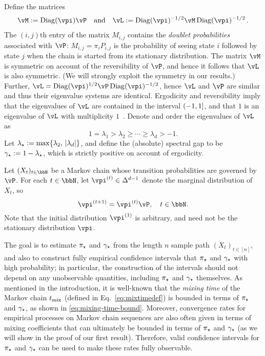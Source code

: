 Define the matrices
\begin{align*}
\vM := \Diag(\vpi) \vP \quad \text{and} \quad
\vL := \Diag(\vpi)^{-1/2} \vM \Diag(\vpi)^{-1/2}\,.
\end{align*}
The $(i,j)$th entry of the matrix $M_{i,j}$ contains the \emph{doublet
probabilities} associated with $\vP$: $M_{i,j} = \pi_i P_{i,j}$ is the
probability of seeing state $i$ followed by state $j$ when the chain
is started from its stationary distribution.
The matrix $\vM$ is symmetric on account of the reversibility of
$\vP$, and hence it follows that $\vL$ is also symmetric.
(We will strongly exploit the symmetry in our results.)
Further, $\vL = \Diag(\vpi)^{1/2} \vP \Diag(\vpi)^{-1/2}$, hence $\vL$
and $\vP$ are similar and thus their eigenvalue systems are identical.
Ergodicity and reversibility imply that the eigenvalues of $\vL$ are
contained in the interval $(-1,1]$, and that $1$ is an
eigenvalue of $\vL$ with multiplicity $1$~\citep[Lemmas 12.1 and
12.2]{LePeWi08}.
Denote and order the eigenvalues of $\vL$ as
\[
  1 = \lambda_1 > \lambda_2 \geq \dotsb \geq \lambda_d > -1 .
\]
Let $\lambda_{\star} := \max\{ \lambda_2,\, |\lambda_d| \}$, and define the
(absolute) spectral gap to be $\gamma_{\star} := 1-\lambda_{\star}$, which is strictly
positive on account of ergodicity.

Let $(X_t)_{t\in\bbN}$ be a Markov chain whose transition
probabilities are governed by $\vP$.
For each $t \in \bbN$, let $\vpi^{(t)} \in \Delta^{d-1}$ denote the
marginal distribution of $X_t$, so
\[
  \vpi^{(t+1)} = \vpi^{(t)} \vP ,
  \quad t \in \bbN .
\]
Note that the initial distribution $\vpi^{(1)}$ is arbitrary,
and need not be the stationary distribution $\vpi$.

The goal is to estimate $\pi_{\star}$ and $\gamma_{\star}$ from the length $n$ sample
path $(X_t)_{t \in [n]}$, and also to construct fully empirical
confidence intervals that $\pi_{\star}$ and $\gamma_{\star}$ with high probability;
in particular, the construction of the intervals should not depend on
any unobservable quantities, including $\pi_{\star}$ and $\gamma_{\star}$ themselves.
As mentioned in the introduction,
it is well-known that the \emph{mixing time} of the Markov chain
$t_{\operatorname{mix}}$ (defined in Eq.~\ref{eq:mixtimedef})
is bounded in terms of $\pi_{\star}$ and $\gamma_{\star}$, as shown in
\cref{eq:mixing-time-bound}.
Moreover, convergence rates for empirical processes on Markov chain
sequences are also often given in terms of mixing coefficients that
can ultimately be bounded in terms of $\pi_{\star}$ and
$\gamma_{\star}$ (as we will show in the proof of our first result).
Therefore, valid confidence intervals for $\pi_{\star}$ and $\gamma_{\star}$ can be
used to make these rates fully observable.

